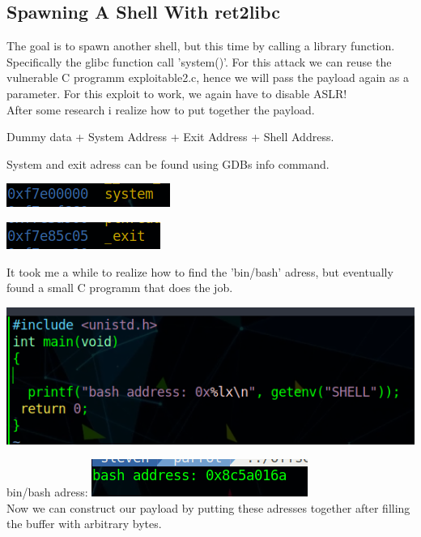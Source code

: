 \documentclass[a4paper,10pt]{article}
\begin{document}
\newpage
\subsection{Spawning A Shell With ret2libc}
The goal is to spawn another shell, but this time by calling a library function.
Specifically the glibc function call 'system()'. For this attack we can reuse the vulnerable C programm exploitable2.c, hence we will pass the payload again as a parameter.
For this exploit to work, we again have to disable ASLR!\\
After some research i realize how to put together the payload.
\begin{center}
 Dummy data + System Address + Exit Address + Shell Address.\\

\end{center}
System and exit adress can be found using GDBs info command.
\begin{center}
 \includegraphics[scale=0.5]{system.png}
\end{center}
\begin{center}
 \includegraphics[scale=0.5]{exit.png}
\end{center}
It took me a while to realize how to find the 'bin/bash' adress, but eventually found a small C programm that does the job.
\begin{center}
\includegraphics[scale=0.5]{basha.png}

\end{center}
bin/bash adress: 
\includegraphics[scale=0.5]{bash.png}\\
Now we can construct our payload by putting these adresses together after filling the buffer with arbitrary bytes.\\
\end{document}
